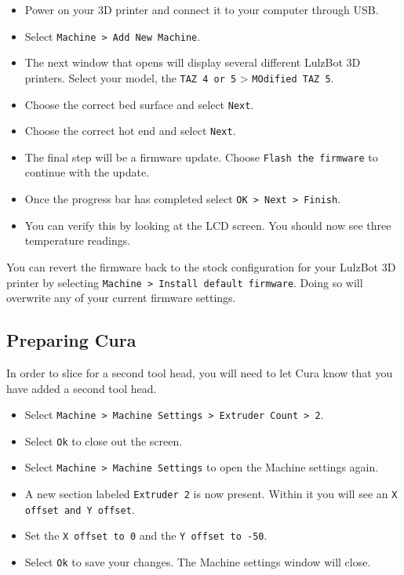 \begin{itemize}
\item Power on your 3D printer and connect it to your computer through USB.
\item Select \texttt{Machine > Add New Machine}.
\item The next window that opens will display several different LulzBot 3D printers. Select your model, the \texttt{TAZ 4 or 5} > \texttt{MOdified TAZ 5}.
\item Choose the correct bed surface and select \texttt{Next}.
\item Choose the correct hot end and select \texttt{Next}.
\item The final step will be a firmware update. Choose \texttt{Flash the firmware} to continue with the update.
\item Once the progress bar has completed select \texttt{OK > Next > Finish}.  
\item You can verify this by looking at the LCD screen. You should now see three temperature readings. 
\end{itemize} 
You can revert the firmware back to the stock configuration for your LulzBot\textsuperscript{\miniscule{\texttrademark}} 3D printer by selecting \texttt{Machine > Install default firmware}. Doing so will overwrite any of your current firmware settings.

\subsection{Preparing Cura}
In order to slice for a second tool head, you will need to let Cura know that you have added a second tool head. 
\begin{itemize} 
\item Select \texttt{Machine > Machine Settings > Extruder Count > 2}.
\item Select \texttt{Ok} to close out the screen.
\item Select \texttt{Machine > Machine Settings} to open the Machine settings again. 
\item A new section labeled \texttt{Extruder 2} is now present. Within it you will see an \texttt{X offset and Y offset}.
\item Set the \texttt{X offset to 0} and the \texttt{Y offset to -50}.
\item Select \texttt{Ok} to save your changes. The Machine settings window will close.
\end{itemize} 


